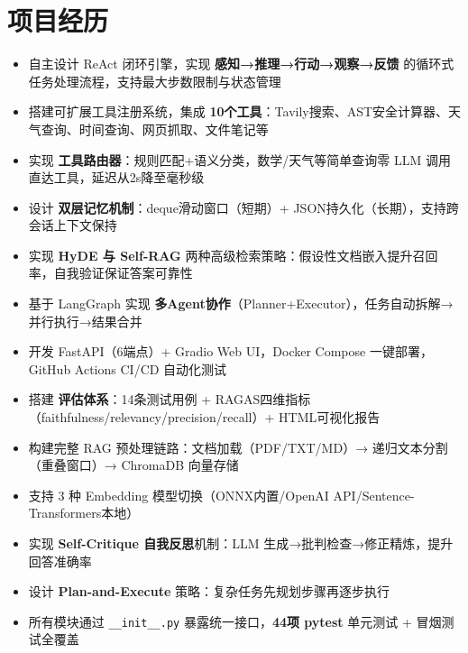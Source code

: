 \documentclass{resume}
\begin{document}
\section{项目经历}
\begin{itemize}
  \item 自主设计 ReAct 闭环引擎，实现 \textbf{感知→推理→行动→观察→反馈} 的循环式任务处理流程，支持最大步数限制与状态管理
  \item 搭建可扩展工具注册系统，集成 \textbf{10个工具}：Tavily搜索、AST安全计算器、天气查询、时间查询、网页抓取、文件笔记等
  \item 实现 \textbf{工具路由器}：规则匹配+语义分类，数学/天气等简单查询零 LLM 调用直达工具，延迟从2s降至毫秒级
  \item 设计 \textbf{双层记忆机制}：deque滑动窗口（短期）+ JSON持久化（长期），支持跨会话上下文保持
  \item 实现 \textbf{HyDE 与 Self-RAG} 两种高级检索策略：假设性文档嵌入提升召回率，自我验证保证答案可靠性
  \item 基于 LangGraph 实现 \textbf{多Agent协作}（Planner+Executor），任务自动拆解→并行执行→结果合并
  \item 开发 FastAPI（6端点）+ Gradio Web UI，Docker Compose 一键部署，GitHub Actions CI/CD 自动化测试
  \item 搭建 \textbf{评估体系}：14条测试用例 + RAGAS四维指标（faithfulness/relevancy/precision/recall）+ HTML可视化报告
\end{itemize}

\begin{itemize}
  \item 构建完整 RAG 预处理链路：文档加载（PDF/TXT/MD）→ 递归文本分割（重叠窗口）→ ChromaDB 向量存储
  \item 支持 3 种 Embedding 模型切换（ONNX内置/OpenAI API/Sentence-Transformers本地）
  \item 实现 \textbf{Self-Critique 自我反思}机制：LLM 生成→批判检查→修正精炼，提升回答准确率
  \item 设计 \textbf{Plan-and-Execute} 策略：复杂任务先规划步骤再逐步执行
  \item 所有模块通过 \texttt{\_\_init\_\_.py} 暴露统一接口，\textbf{44项 pytest} 单元测试 + 冒烟测试全覆盖
\end{itemize}
\end{document}
